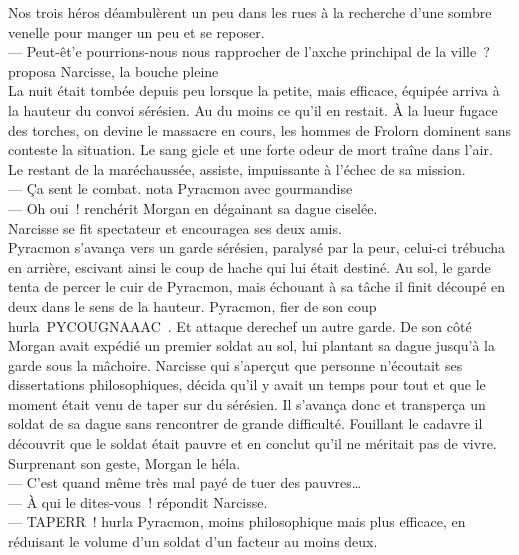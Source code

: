 \documentclass[french, a4paper, 12pt]{article}
\begin{document}
Nos trois héros déambulèrent un peu dans les rues à la recherche d'une sombre venelle pour manger un peu et se reposer.\\
--- Peut-êt'e pourrions-nous nous rapprocher de l'axche princhipal de la ville~? proposa Narcisse, la bouche pleine\\
La nuit était tombée depuis peu lorsque la petite, mais efficace, équipée arriva à la hauteur du convoi sérésien. Au du moins ce qu'il en restait. À la lueur fugace des torches, on devine le massacre en cours, les hommes de Frolorn dominent sans conteste la situation. Le sang gicle et une forte odeur de mort traîne dans l'air. Le restant de la maréchaussée, assiste, impuissante à l'échec de sa mission.\\
--- Ça sent le combat. nota Pyracmon avec gourmandise\\
--- Oh oui~! renchérit Morgan en dégainant sa dague ciselée.\\
Narcisse se fit spectateur et encouragea ses deux amis.\\

Pyracmon s'avança vers un garde sérésien, paralysé par la peur, celui-ci trébucha en arrière, escivant ainsi le coup de hache qui lui était destiné. Au sol, le garde tenta de percer le cuir de Pyracmon, mais échouant à sa tâche il finit découpé en deux dans le sens de la hauteur. Pyracmon, fier de son coup hurla~\og PYCOUGNAAAC~\fg. Et attaque derechef un autre garde. De son côté Morgan avait expédié un premier soldat au sol, lui plantant sa dague jusqu'à la garde sous la mâchoire. Narcisse qui s'aperçut que personne n'écoutait ses dissertations philosophiques, décida qu'il y avait un temps pour tout et que le moment était venu de taper sur du sérésien. Il s'avança donc et transperça un soldat de sa dague sans rencontrer de grande difficulté. Fouillant le cadavre il découvrit que le soldat était pauvre et en conclut qu'il ne méritait pas de vivre. Surprenant son geste, Morgan le héla.\\
--- C'est quand même très mal payé de tuer des pauvres…\\
--- À qui le dites-vous~! répondit Narcisse.\\
--- TAPERR~! hurla Pyracmon, moins philosophique mais plus efficace, en réduisant le volume d'un soldat d'un facteur au moins deux.\\






 
\end{document}
